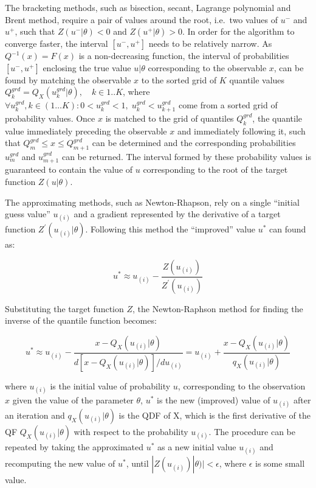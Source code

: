 \documentclass[
  12pt,
]{article}
\begin{document}
The bracketing methods, such as bisection, secant, Lagrange polynomial and Brent method, require a pair of values around the root, i.e.~two values of \(u^-\) and \(u^+\), such that \(Z(u^-|\theta)<0\) and \(Z(u^+|\theta)>0\). In order for the algorithm to converge faster, the interval \([u^-, u^+]\) needs to be relatively narrow. As \(Q^{-1}(x)=F(x)\) is a non-decreasing function, the interval of probabilities \([u^-, u^+]\) enclosing the true value \(u|\theta\) corresponding to the observable \(x\), can be found by matching the observable \(x\) to the sorted grid of \(K\) quantile values \(Q^{grd}_k=Q_X(u^{grd}_k|\theta), \quad k \in 1..K\), where \(\forall u^{grd}_k, k \in (1\dots K): 0<u^{grd}_k<1, \; u^{grd}_k<u^{grd}_{k+1}\) come from a sorted grid of probability values. Once \(x\) is matched to the grid of quantiles \(Q^{grd}_k\), the quantile value immediately preceding the observable \(x\) and immediately following it, such that \(Q^{grd}_{m} \leq x \leq Q^{grd}_{m+1}\) can be determined and the corresponding probabilities \(u^{grd}_m\) and \(u^{grd}_{m+1}\) can be returned. The interval formed by these probability values is guaranteed to contain the value of \(u\) corresponding to the root of the target function \(Z(u|\theta)\).

The approximating methods, such as Newton-Rhapson, rely on a single ``initial guess value'' \(u_{(i)}\) and a gradient represented by the derivative of a target function \(Z^\prime(u_{(i)}|\theta)\). Following this method the ``improved'' value \(u^*\) can found as:

\[
u^*\approx u_{(i)} -\frac{Z(u_{(i)})}{Z^\prime(u_{(i)})}
\]

Substituting the target function \(Z\), the Newton-Raphson method for finding the inverse of the quantile function becomes:

\[
u^*\approx u_{(i)}-\frac{x-Q_X(u_{(i)}|\theta)}{d[x-Q_X(u_{(i)}|\theta)]/du_{(i)}}= u_{(i)}+\frac{x-Q_X(u_{(i)}|\theta)}{q_X(u_{(i)}|\theta)}
\]

where \(u_{(i)}\) is the initial value of probability \(u\), corresponding to the observation \(x\) given the value of the parameter \(\theta\), \(u^*\) is the new (improved) value of \(u_{(i)}\) after an iteration and \(q_X(u_{(i)}|\theta)\) is the QDF of X, which is the first derivative of the QF \(Q_X(u_{(i)}|\theta)\) with respect to the probability \(u_{(i)}\). The procedure can be repeated by taking the approximated \(u^*\) as a new initial value \(u_{(i)}\) and recomputing the new value of \(u^*\), until \(|Z(u_{(i)})|\theta)|< \epsilon\), where \(\epsilon\) is some small value.
\end{document}
